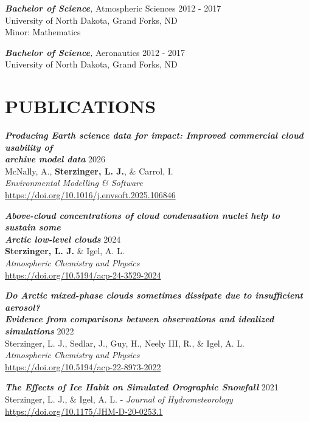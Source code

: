 \documentclass[overlapped]{res}
\begin{document}
\begin{resume}
    {\sl \textbf{Bachelor of Science},} Atmospheric Sciences
    \hfill 2012 - 2017\\
    University of North Dakota, Grand Forks, ND \\
    Minor: Mathematics 

    {\sl \textbf{Bachelor of Science},} Aeronautics 
    \hfill 2012 - 2017 \\
    University of North Dakota, Grand Forks, ND

\section{PUBLICATIONS}
    {\sl \textbf{Producing Earth science data for impact: Improved commercial cloud usability of \\ archive model data}}
    \hfill 2026 \\ McNally, A., \textbf{Sterzinger, L. J.}, \& Carrol, I. \\ \textit{Environmental Modelling \& Software} \\ \href{https://doi.org/10.1016/j.envsoft.2025.106846}{https://doi.org/10.1016/j.envsoft.2025.106846}

    {\sl \textbf{Above-cloud concentrations of cloud condensation nuclei help to sustain some \\ Arctic low-level clouds}}
    \hfill 2024 \\ \textbf{Sterzinger, L. J.} \& Igel, A. L. \\ \textit{Atmospheric Chemistry and Physics} \\ \href{https://doi.org/10.5194/acp-24-3529-2024}{https://doi.org/10.5194/acp-24-3529-2024}

    {\sl \textbf{Do Arctic mixed-phase clouds sometimes dissipate due to insufficient aerosol?\\Evidence from comparisons between observations and idealized simulations}}
    \hfill 2022 \\ Sterzinger, L. J., Sedlar, J., Guy, H., Neely III, R., \& Igel, A. L. \\ \textit{Atmospheric Chemistry and Physics} \\ \href{https://doi.org/10.5194/acp-22-8973-2022}{https://doi.org/10.5194/acp-22-8973-2022}

    {\sl \textbf{The Effects of Ice Habit on Simulated Orographic Snowfall}} 
    \hfill 2021 \\ Sterzinger, L. J., \& Igel, A. L. - \textit{Journal of Hydrometeorology} \\ \href{https://doi.org/10.1175/JHM-D-20-0253.1}{https://doi.org/10.1175/JHM-D-20-0253.1}
\\


\end{resume}
\end{document}
